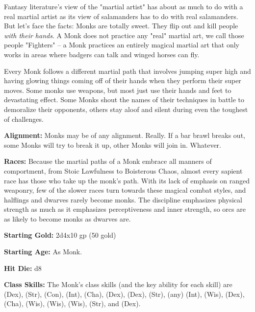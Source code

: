 
Fantasy literature's view of the "martial artist" has about as much to do with a real martial artist as its view of salamanders has to do with real salamanders. But let's face the facts: Monks are totally sweet. They flip out and kill people \textit{with their hands}. A Monk does not practice any "real" martial art, we call those people "Fighters" -- a Monk practices an entirely magical martial art that only works in areas where badgers can talk and winged horses can fly.

Every Monk follows a different martial path that involves jumping super high and having glowing things coming off of their hands when they perform their super moves. Some monks use weapons, but most just use their hands and feet to devastating effect. Some Monks shout the names of their techniques in battle to demoralize their opponents, others stay aloof and silent during even the toughest of challenges.

\textbf{Alignment:} Monks may be of any alignment. Really. If a bar brawl breaks out, some Monks will try to break it up, other Monks will join in. Whatever.

\textbf{Races:} Because the martial paths of a Monk embrace all manners of comportment, from Stoic Lawfulness to Boisterous Chaos, almost every sapient race has those who take up the monk's path. With its lack of emphasis on ranged weaponry, few of the slower races turn towards these magical combat styles, and halflings and dwarves rarely become monks. The discipline emphasizes physical strength as much as it emphasizes perceptiveness and inner strength, so orcs are as likely to become monks as dwarves are.

\textbf{Starting Gold:} 2d4x10 gp (50 gold)

\textbf{Starting Age:} As Monk.

\textbf{Hit Die:} d8

\textbf{Class Skills:} The Monk's class skills (and the key ability for each skill) are  (Dex),  (Str),  (Con),  (Int),  (Cha),  (Dex),  (Dex),  (Str),  (any) (Int),  (Wis),  (Dex),  (Cha),  (Wis),  (Wis),  (Wis),  (Str), and  (Dex).

